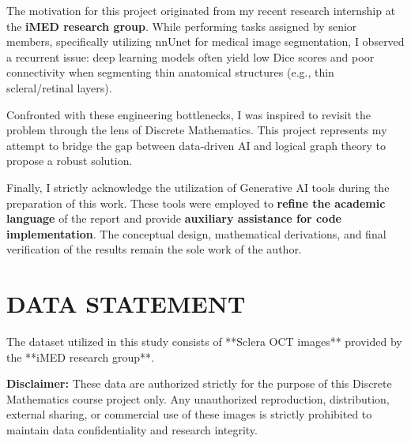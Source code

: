 \documentclass[twocolumn, 10pt, a4paper]{article}
\begin{document}
The motivation for this project originated from my recent research internship at the \textbf{iMED research group}. While performing tasks assigned by senior members, specifically utilizing nnUnet for medical image segmentation, I observed a recurrent issue: deep learning models often yield low Dice scores and poor connectivity when segmenting thin anatomical structures (e.g., thin scleral/retinal layers). 

Confronted with these engineering bottlenecks, I was inspired to revisit the problem through the lens of Discrete Mathematics. This project represents my attempt to bridge the gap between data-driven AI and logical graph theory to propose a robust solution.

Finally, I strictly acknowledge the utilization of Generative AI tools during the preparation of this work. These tools were employed to \textbf{refine the academic language} of the report and provide \textbf{auxiliary assistance for code implementation}. The conceptual design, mathematical derivations, and final verification of the results remain the sole work of the author.

\section{DATA STATEMENT}
The dataset utilized in this study consists of **Sclera OCT images** provided by the **iMED research group**. 

\textbf{Disclaimer:} These data are authorized strictly for the purpose of this Discrete Mathematics course project only. Any unauthorized reproduction, distribution, external sharing, or commercial use of these images is strictly prohibited to maintain data confidentiality and research integrity.
\end{document}
